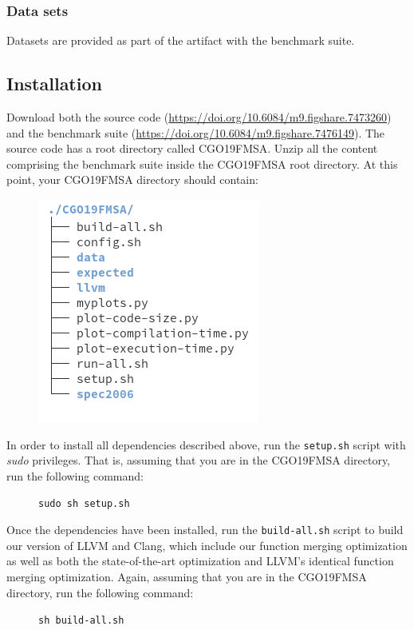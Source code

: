 {\subsubsection{Data sets}

Datasets are provided as part of the artifact with the benchmark suite.

\subsection{Installation}

Download both the source code (\url{https://doi.org/10.6084/m9.figshare.7473260})
and the benchmark suite (\url{https://doi.org/10.6084/m9.figshare.7476149}).
The source code has a root directory called CGO19FMSA.
Unzip all the content comprising the benchmark suite inside the CGO19FMSA root directory.
At this point, your CGO19FMSA directory should contain:

\begin{figure}[h]
\includegraphics[scale=0.5]{figs/artifact/tree.png}
\end{figure}

In order to install all dependencies described above, run the \texttt{setup.sh}
script with \textit{sudo} privileges. That is, assuming that you are in the
CGO19FMSA directory, run the following command:

\begin{figure}[h]
\texttt{sudo sh setup.sh}
\end{figure}

Once the dependencies have been installed, run the \texttt{build-all.sh}
script to build our version of LLVM and Clang, which include our function
merging optimization as well as both the state-of-the-art optimization and LLVM's
identical function merging optimization.
Again, assuming that you are in the CGO19FMSA directory, run the following
command:
\newpage
\begin{figure}[h]
\texttt{sh build-all.sh}
\end{figure}

}
